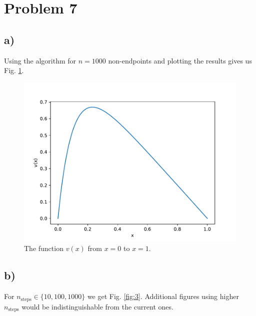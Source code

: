 \documentclass[english,notitlepage]{revtex4-2}  %
\begin{document}
\section*{Problem 7}
\subsection*{a)}
Using the algorithm for $n=1000$ non-endpoints and plotting the results gives us Fig. \ref{fig:2}.

\begin{figure}
	\includegraphics[scale=0.9]{imgs/problem7_output.pdf}
	\caption{The function $v(x)$ from $x=0$ to $x=1$.}
	\label{fig:2}
\end{figure}

\subsection*{b)}
For $n_{\text{steps}}\in\{10, 100, 1000\}$ we get Fig. \ref{fig:3}. Additional figures using higher $n_{\text{steps}}$ would be indistinguishable from the current ones.
\end{document}
